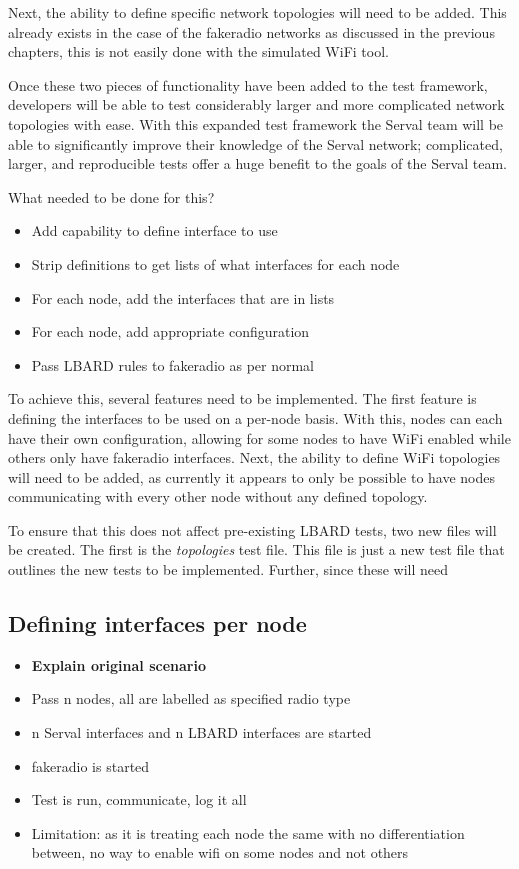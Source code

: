 Next, the ability to define specific network topologies will need to be added.
This already exists in the case of the fakeradio networks as discussed in the previous chapters, this is not easily done with the simulated WiFi tool.

Once these two pieces of functionality have been added to the test framework, developers will be able to test considerably larger and more complicated network topologies with ease.
With this expanded test framework the Serval team will be able to significantly improve their knowledge of the Serval network; complicated, larger, and reproducible tests offer a huge benefit to the goals of the Serval team. 

What needed to be done for this?
\begin{itemize}
    \item Add capability to define interface to use
    \item Strip definitions to get lists of what interfaces for each node
    \item For each node, add the interfaces that are in lists
    \item For each node, add appropriate configuration
    \item Pass LBARD rules to fakeradio as per normal
\end{itemize}


To achieve this, several features need to be implemented. 
The first feature is defining the interfaces to be used on a per-node basis.
With this, nodes can each have their own configuration, allowing for some nodes to have WiFi enabled while others only have fakeradio interfaces.
Next, the ability to define WiFi topologies will need to be added, as currently it appears to only be possible to have nodes communicating with every other node without any defined topology.

To ensure that this does not affect pre-existing LBARD tests, two new files will be created.
The first is the \emph{topologies} test file.
This file is just a new test file that outlines the new tests to be implemented.
Further, since these will need 

\subsection{Defining interfaces per node}
\begin{itemize}
    \item \textbf{Explain original scenario}
    \item Pass n nodes, all are labelled as specified radio type
    \item n Serval interfaces and n LBARD interfaces are started
    \item fakeradio is started
    \item Test is run, communicate, log it all
    \item Limitation: as it is treating each node the same with no differentiation between, no way to enable wifi on some nodes and not others
\end{itemize}


